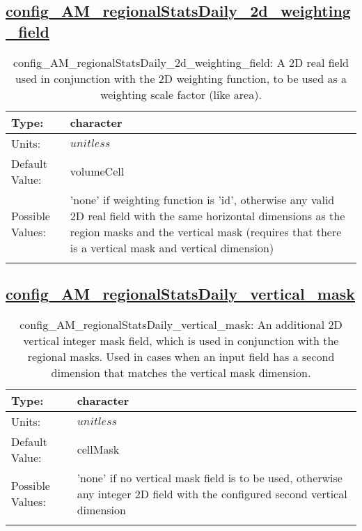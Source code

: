 \subsection[config\_AM\_regionalStatsDaily\_2d\_weighting\_field]{\hyperref[sec:nm_tab_AM_regionalStatsDaily]{config\_AM\_regionalStatsDaily\_2d\_weighting\_field}}
\label{subsec:nm_sec_config_AM_regionalStatsDaily_2d_weighting_field}
\begin{center}
\begin{longtable}{| p{2.0in} || p{4.0in} |}
    \hline
    Type: & character \\
    \hline
    Units: & $unitless$ \\
    \hline
    Default Value: & volumeCell \\
    \hline
    Possible Values: & 'none' if weighting function is 'id', otherwise any valid 2D real field with the same horizontal dimensions as the region masks and the vertical mask (requires that there is a vertical mask and vertical dimension) \\
    \hline
    \caption{config\_AM\_regionalStatsDaily\_2d\_weighting\_field: A 2D real field used in conjunction with the 2D weighting function, to be used as a weighting scale factor (like area).}
\end{longtable}
\end{center}
\subsection[config\_AM\_regionalStatsDaily\_vertical\_mask]{\hyperref[sec:nm_tab_AM_regionalStatsDaily]{config\_AM\_regionalStatsDaily\_vertical\_mask}}
\label{subsec:nm_sec_config_AM_regionalStatsDaily_vertical_mask}
\begin{center}
\begin{longtable}{| p{2.0in} || p{4.0in} |}
    \hline
    Type: & character \\
    \hline
    Units: & $unitless$ \\
    \hline
    Default Value: & cellMask \\
    \hline
    Possible Values: & 'none' if no vertical mask field is to be used, otherwise any integer 2D field with the configured second vertical dimension \\
    \hline
    \caption{config\_AM\_regionalStatsDaily\_vertical\_mask: An additional 2D vertical integer mask field, which is used in conjunction with the regional masks. Used in cases when an input field has a second dimension that matches the vertical mask dimension.}
\end{longtable}
\end{center}
